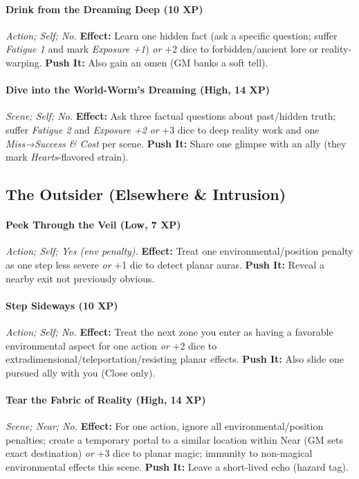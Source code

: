 \documentclass[12pt,twoside]{book}
\begin{document}
\paragraph{Drink from the Dreaming Deep (10 XP)} \emph{Action; Self; No.}
\textbf{Effect:} Learn one hidden fact (ask a specific question; suffer \emph{Fatigue 1} and mark \emph{Exposure +1}) \emph{or} +2 dice to forbidden/ancient lore or reality-warping.
\textbf{Push It:} Also gain an omen (GM banks a soft tell).
\paragraph{Dive into the World-Worm’s Dreaming (High, 14 XP)} \emph{Scene; Self; No.}
\textbf{Effect:} Ask three factual questions about past/hidden truth; suffer \emph{Fatigue 2} and \emph{Exposure +2} \emph{or} +3 dice to deep reality work and one \emph{Miss→Success \& Cost} per scene.
\textbf{Push It:} Share one glimpse with an ally (they mark \emph{Hearts}-flavored strain).

\subsection{The Outsider (Elsewhere \& Intrusion)}
\paragraph{Peek Through the Veil (Low, 7 XP)} \emph{Action; Self; Yes (env penalty).}
\textbf{Effect:} Treat one environmental/position penalty as one step less severe \emph{or} +1 die to detect planar auras.
\textbf{Push It:} Reveal a nearby exit not previously obvious.
\paragraph{Step Sideways (10 XP)} \emph{Action; Self; No.}
\textbf{Effect:} Treat the next zone you enter as having a favorable environmental aspect for one action \emph{or} +2 dice to extradimensional/teleportation/resisting planar effects.
\textbf{Push It:} Also slide one pursued ally with you (Close only).
\paragraph{Tear the Fabric of Reality (High, 14 XP)} \emph{Scene; Near; No.}
\textbf{Effect:} For one action, ignore all environmental/position penalties; create a temporary portal to a similar location within Near (GM sets exact destination) \emph{or} +3 dice to planar magic; immunity to non-magical environmental effects this scene.
\textbf{Push It:} Leave a short-lived echo (hazard tag).
\end{document}
